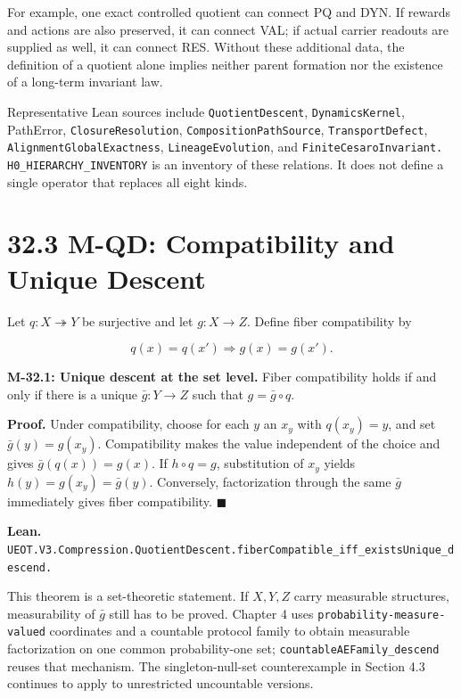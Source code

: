 \documentclass[
  english,
  11pt,
  oneside]{book}
\begin{document}
For example, one exact controlled quotient can connect PQ and DYN. If rewards and actions are also preserved, it can connect VAL; if actual carrier readouts are supplied as well, it can connect RES. Without these additional data, the definition of a quotient alone implies neither parent formation nor the existence of a long-term invariant law.

Representative Lean sources include \nolinkurl{QuotientDescent}, \nolinkurl{DynamicsKernel}, PathError, \nolinkurl{ClosureResolution}, \nolinkurl{CompositionPathSource}, \nolinkurl{TransportDefect}, \nolinkurl{AlignmentGlobalExactness}, \nolinkurl{LineageEvolution}, and \nolinkurl{FiniteCesaroInvariant.} \nolinkurl{H0_HIERARCHY_INVENTORY} is an inventory of these relations. It does not define a single operator that replaces all eight kinds.

\section{32.3 M-QD: Compatibility and Unique Descent}\label{m-qd-compatibility-and-unique-descent}

Let \(q:X\twoheadrightarrow Y\) be surjective and let \(g:X\to Z\). Define fiber compatibility by

\[q(x)=q(x')\Longrightarrow g(x)=g(x').\]

\hypertarget{m-32-1}{}\label{m-32-1}

\textbf{M-32.1: Unique descent at the set level.} Fiber compatibility holds if and only if there is a unique \(\bar g:Y\to Z\) such that \(g=\bar g\circ q\).

\textbf{Proof.} Under compatibility, choose for each \(y\) an \(x_y\) with \(q(x_y)=y\), and set \(\bar g(y)=g(x_y)\). Compatibility makes the value independent of the choice and gives \(\bar g(q(x))=g(x)\). If \(h\circ q=g\), substitution of \(x_y\) yields \(h(y)=g(x_y)=\bar g(y)\). Conversely, factorization through the same \(\bar g\) immediately gives fiber compatibility. \(\blacksquare\)

\textbf{Lean.} \nolinkurl{UEOT.V3.Compression.QuotientDescent.fiberCompatible_iff_existsUnique_descend.}

This theorem is a set-theoretic statement. If \(X,Y,Z\) carry measurable structures, measurability of \(\bar g\) still has to be proved. Chapter 4 uses \nolinkurl{probability-measure-valued} coordinates and a countable protocol family to obtain measurable factorization on one common probability-one set; \nolinkurl{countableAEFamily_descend} reuses that mechanism. The singleton-null-set counterexample in Section 4.3 continues to apply to unrestricted uncountable versions.
\end{document}
